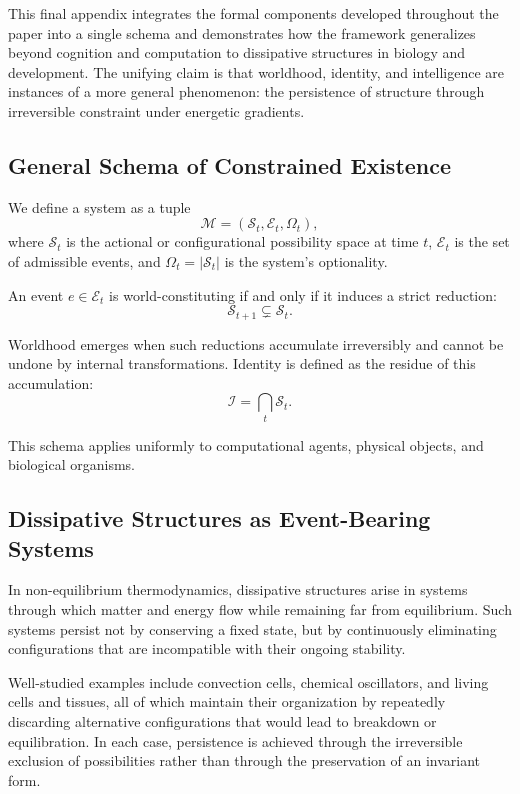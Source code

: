 \documentclass[11pt]{article}
\begin{document}
This final appendix integrates the formal components developed throughout the paper into a single schema and demonstrates how the framework generalizes beyond cognition and computation to dissipative structures in biology and development. The unifying claim is that worldhood, identity, and intelligence are instances of a more general phenomenon: the persistence of structure through irreversible constraint under energetic gradients.

\subsection{General Schema of Constrained Existence}

We define a system as a tuple
\[
\mathcal{M} = (\mathcal{S}_t, \mathcal{E}_t, \Omega_t),
\]
where $\mathcal{S}_t$ is the actional or configurational possibility space at time $t$, $\mathcal{E}_t$ is the set of admissible events, and $\Omega_t = |\mathcal{S}_t|$ is the system’s optionality.

An event $e \in \mathcal{E}_t$ is world-constituting if and only if it induces a strict reduction:
\[
\mathcal{S}_{t+1} \subsetneq \mathcal{S}_t.
\]

Worldhood emerges when such reductions accumulate irreversibly and cannot be undone by internal transformations. Identity is defined as the residue of this accumulation:
\[
\mathcal{I} = \bigcap_{t} \mathcal{S}_t.
\]

This schema applies uniformly to computational agents, physical objects, and biological organisms.

\subsection{Dissipative Structures as Event-Bearing Systems}

In non-equilibrium thermodynamics, dissipative structures arise in systems through which matter and energy flow while remaining far from equilibrium. Such systems persist not by conserving a fixed state, but by continuously eliminating configurations that are incompatible with their ongoing stability.

Well-studied examples include convection cells, chemical oscillators, and living cells and tissues, all of which maintain their organization by repeatedly discarding alternative configurations that would lead to breakdown or equilibration. In each case, persistence is achieved through the irreversible exclusion of possibilities rather than through the preservation of an invariant form.
\end{document}

